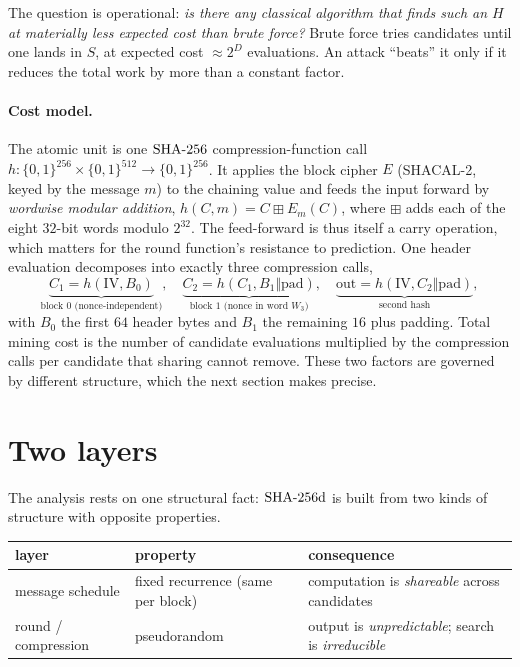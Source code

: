 \documentclass[11pt]{article}
\begin{document}
The question is operational: \emph{is there any classical algorithm that
finds such an $H$ at materially less expected cost than brute force?}
Brute force tries candidates until one lands in $S$, at expected cost
$\approx 2^{D}$ evaluations. An attack ``beats'' it only if it reduces the
total work by more than a constant factor.

\paragraph{Cost model.}
The atomic unit is one $\mathrm{SHA\text{-}256}$ compression-function call
$h:\{0,1\}^{256}\times\{0,1\}^{512}\to\{0,1\}^{256}$. It applies the
block cipher $E$ (SHACAL-2, keyed by the message $m$) to the chaining
value and feeds the input forward by \emph{wordwise modular addition},
$h(C,m) = C \boxplus E_m(C)$, where $\boxplus$ adds each of the eight
$32$-bit words modulo $2^{32}$. The feed-forward is thus itself a carry
operation, which matters for the round function's resistance to
prediction. One header
evaluation decomposes into exactly three compression calls,
\[
\underbrace{C_1 = h(\mathrm{IV},B_0)}_{\text{block 0 (nonce-independent)}},\quad
\underbrace{C_2 = h(C_1,B_1\Vert\mathrm{pad})}_{\text{block 1 (nonce in word }W_3)},\quad
\underbrace{\mathrm{out}=h(\mathrm{IV},C_2\Vert\mathrm{pad})}_{\text{second hash}},
\]
with $B_0$ the first $64$ header bytes and $B_1$ the remaining $16$ plus
padding. Total mining cost is the number of candidate evaluations
multiplied by the compression calls per candidate that sharing cannot
remove. These two factors are governed by different structure, which the
next section makes precise.

\section{Two layers}\label{sec:twolayers}

The analysis rests on one structural fact: $\mathrm{SHA\text{-}256d}$ is built from two
kinds of structure with opposite properties.

\begin{center}
\begin{tabular}{ll p{}}
\hline
\textbf{layer} & \textbf{property} & \textbf{consequence}\\
\hline
message schedule & fixed recurrence (same per block) & computation is \emph{shareable} across candidates\\
round / compression & pseudorandom & output is \emph{unpredictable}; search is \emph{irreducible}\\
\hline
\end{tabular}
\end{center}
\end{document}
